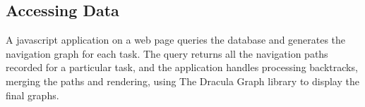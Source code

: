 \subsection{Accessing Data}

A javascript application on a web page queries the database and
generates the navigation graph for each task. The query returns all
the navigation paths recorded for a particular task, and the
application handles processing backtracks, merging the paths and
rendering, using The Dracula Graph library \cite{dracula-graph} to
display the final graphs.
